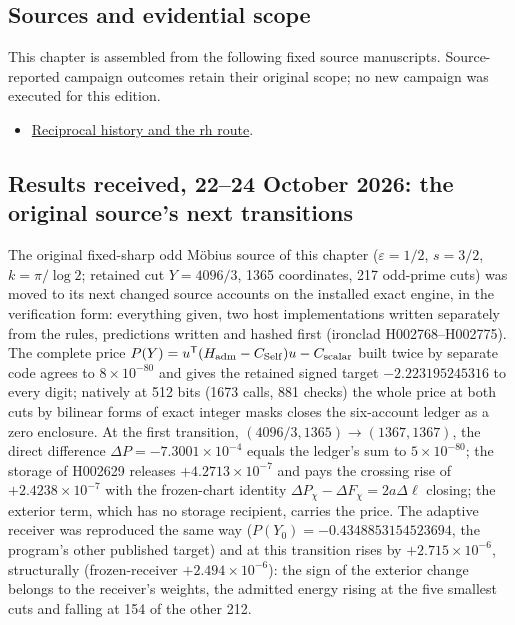 \subsection{Sources and evidential
scope}\label{viii-ch09-sources-and-evidential-scope}

This chapter is assembled from the following fixed source manuscripts.
Source-reported campaign outcomes retain their original scope; no new
campaign was executed for this edition.

\begin{itemize}
\tightlist
\item
  \href{https://github.com/iwtbotiwtwot/SAMA/blob/4c2b5dc1649da5900c90b90d0ce56c223dbb7717/vol_iii/03-writes-and-history/reciprocal-history-and-the-rh-route.md}{Reciprocal
  history and the rh route}.
\end{itemize}

\subsection{Results received, 22--24 October 2026: the original source's next transitions}
\label{v3c20:received}
The original fixed-sharp odd M\"obius source of this chapter ($\varepsilon=1/2$, $s=3/2$, $k=\pi/\log 2$; retained cut $Y=4096/3$, 1365 coordinates, 217 odd-prime cuts) was moved to its next changed source accounts on the installed exact engine, in the verification form: everything given, two host implementations written separately from the rules, predictions written and hashed first (ironclad H002768--H002775).\cite{v3rhtransitions} The complete price $P(Y)=u^{\mathsf T}(H_{\rm adm}-C_{\rm Self})u-C_{\rm scalar}$ built twice by separate code agrees to $8\times10^{-80}$ and gives the retained signed target $-2.223195245316$ to every digit; natively at 512 bits (1673 calls, 881 checks) the whole price at both cuts by bilinear forms of exact integer masks closes the six-account ledger as a zero enclosure. At the first transition, $(4096/3,1365)\to(1367,1367)$, the direct difference $\Delta P=-7.3001\times10^{-4}$ equals the ledger's sum to $5\times10^{-80}$; the storage of H002629 releases $+4.2713\times10^{-7}$ and pays the crossing rise of $+2.4238\times10^{-7}$ with the frozen-chart identity $\Delta P_\chi-\Delta F_\chi=2a\Delta\ell$ closing; the exterior term, which has no storage recipient, carries the price. The adaptive receiver was reproduced the same way ($P(Y_0)=-0.4348853154523694$, the program's other published target) and at this transition rises by $+2.715\times10^{-6}$, structurally (frozen-receiver $+2.494\times10^{-6}$): the sign of the exterior change belongs to the receiver's weights, the admitted energy rising at the five smallest cuts and falling at 154 of the other 212.

